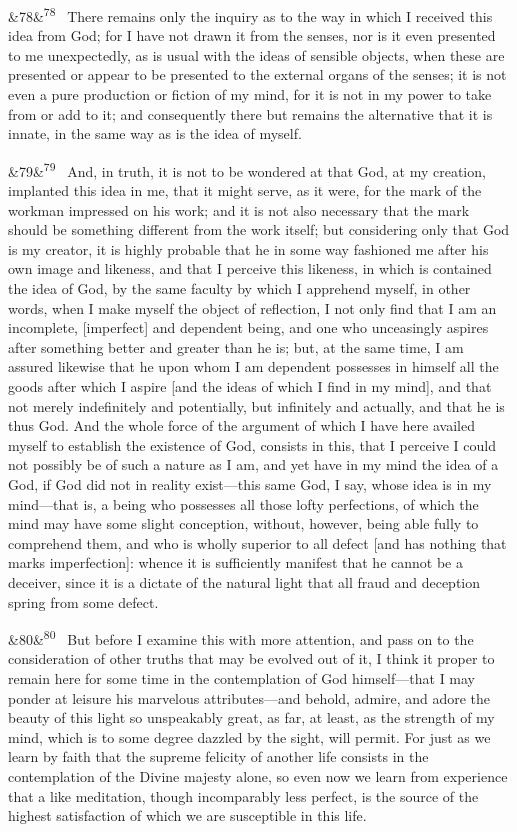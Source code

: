 \documentclass[12pt]{article}
\newcommand{\para}[1][]{\par\noindent\ifx&#1&\else\textsuperscript{\footnotesize #1}~\fi}
\begin{document}
\para[78] There remains only the inquiry as to the way in which I received this idea from God; for I have not drawn it from the senses, nor is it even presented to me unexpectedly, as is usual with the ideas of sensible objects, when these are presented or appear to be presented to the external organs of the senses; it is not even a pure production or fiction of my mind, for it is not in my power to take from or add to it; and consequently there but remains the alternative that it is innate, in the same way as is the idea of myself.

\para[79] And, in truth, it is not to be wondered at that God, at my creation, implanted this idea in me, that it might serve, as it were, for the mark of the workman impressed on his work; and it is not also necessary that the mark should be something different from the work itself; but considering only that God is my creator, it is highly probable that he in some way fashioned me after his own image and likeness, and that I perceive this likeness, in which is contained the idea of God, by the same faculty by which I apprehend myself, in other words, when I make myself the object of reflection, I not only find that I am an incomplete, [imperfect] and dependent being, and one who unceasingly aspires after something better and greater than he is; but, at the same time, I am assured likewise that he upon whom I am dependent possesses in himself all the goods after which I aspire [and the ideas of which I find in my mind], and that not merely indefinitely and potentially, but infinitely and actually, and that he is thus God. And the whole force of the argument of which I have here availed myself to establish the existence of God, consists in this, that I perceive I could not possibly be of such a nature as I am, and yet have in my mind the idea of a God, if God did not in reality exist---this same God, I say, whose idea is in my mind---that is, a being who possesses all those lofty perfections, of which the mind may have some slight conception, without, however, being able fully to comprehend them, and who is wholly superior to all defect [and has nothing that marks imperfection]: whence it is sufficiently manifest that he cannot be a deceiver, since it is a dictate of the natural light that all fraud and deception spring from some defect.

\para[80] But before I examine this with more attention, and pass on to the consideration of other truths that may be evolved out of it, I think it proper to remain here for some time in the contemplation of God himself---that I may ponder at leisure his marvelous attributes---and behold, admire, and adore the beauty of this light so unspeakably great, as far, at least, as the strength of my mind, which is to some degree dazzled by the sight, will permit. For just as we learn by faith that the supreme felicity of another life consists in the contemplation of the Divine majesty alone, so even now we learn from experience that a like meditation, though incomparably less perfect, is the source of the highest satisfaction of which we are susceptible in this life.
\end{document}
